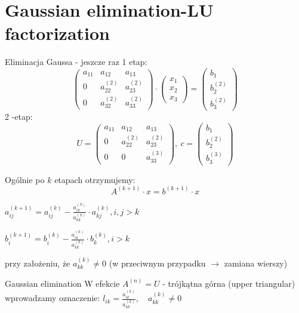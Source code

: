 \section{Gaussian elimination-LU factorization}

\begin{frame}{Eliminacja Gaussa - jeszcze raz}
1 etap:
$$
\left(\begin{array}{lll}
a_{11} & a_{12} & a_{13}\\
0 & a_{22}^{(2)} &a_{23}^{(2)}\\
0 & a_{32}^{(2)} & a_{33}^{(2)}
\end{array}\right) \cdot
 \left(\begin{array}{l}
x_{1}\\
x_{2}\\
x_{3}
\end{array}\right)=
\left(\begin{array}{l}
b_{1} \\
b_{2}^{(2)} \\
b_{3}^{(2)}
\end{array}\right)
$$
2 -etap:
$$
U = \left(\begin{array}{lll}
a_{11} & a_{12} & a_{13}\\
0 & a_{22}^{(2)} &a_{23}^{(2)}\\
0 & 0 & a_{33}^{(3)}
\end{array}\right)
,\ c=\left(\begin{array}{l}
b_{1}\\
b_{2}^{(2)}\\
b_{3}^{(3)}
\end{array}\right)
$$
\end{frame}
\begin{frame}{}

Ogólnie po $k$ etapach otrzymujemy:
$$
A^{(k+1)}\cdot x=b^{(k+1)}\cdot x
$$

$a_{ij}^{(k+1)}=a_{ij}^{(k)}-\displaystyle \frac{a_{ik}^{(k)}}{a_{kk}^{(k)}}\cdot a_{kj}^{(k)}, i, j>k$ 


$b_{i}^{(k+1)}=b_{i}^{(k)}-\displaystyle \frac{a_{ik}^{(k)}}{a_{kk}^{(k)}}\cdot b_{k}^{(k)}, i>k$ 

przy założeniu, że $a_{kk}^{(k)}\neq 0$ (w przeciwnym przypadku $\rightarrow$ zamiana wierszy)

\end{frame}
\begin{frame}{Gaussian elimination}
W efekcie $A^{(n)}=U$ - trójkątna górna (upper triangular) \\
wprowadzamy oznaczenie: $l_{ik}=\displaystyle \frac{a_{ik}^{(k)}}{a_{kk}^{(k)}}, \quad a_{kk}^{(k)}\neq 0 $
\end{frame}
